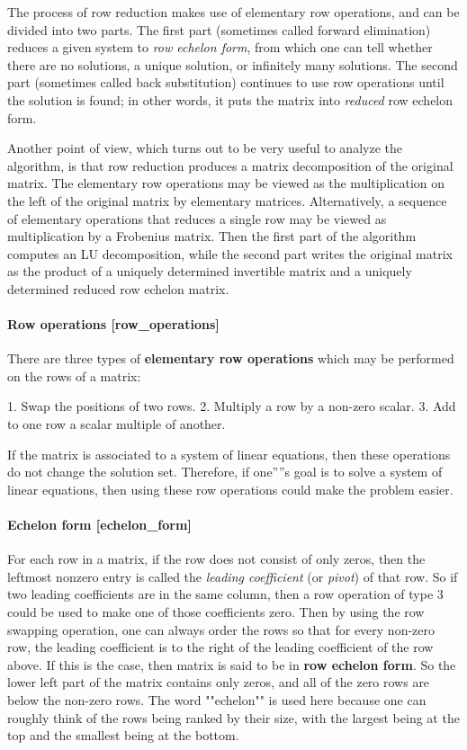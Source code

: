{{{{{{{{{{{{{{{{The process of row reduction makes use of elementary row operations, and
can be divided into two parts. The first part (sometimes called forward
elimination) reduces a given system to \textit{row echelon form}, from which
one can tell whether there are no solutions, a unique solution, or
infinitely many solutions. The second part (sometimes called back
substitution) continues to use row operations until the solution is
found; in other words, it puts the matrix into \textit{reduced} row echelon
form.

Another point of view, which turns out to be very useful to analyze the
algorithm, is that row reduction produces a matrix decomposition of the
original matrix. The elementary row operations may be viewed as the
multiplication on the left of the original matrix by elementary
matrices. Alternatively, a sequence of elementary operations that
reduces a single row may be viewed as multiplication by a Frobenius
matrix. Then the first part of the algorithm computes an LU
decomposition, while the second part writes the original matrix as the
product of a uniquely determined invertible matrix and a uniquely
determined reduced row echelon matrix.

\paragraph{Row operations [row_operations]}

There are three types of \textbf{elementary row operations} which may be
performed on the rows of a matrix:

1.  Swap the positions of two rows.
2.  Multiply a row by a non-zero scalar.
3.  Add to one row a scalar multiple of another.

If the matrix is associated to a system of linear equations, then these
operations do not change the solution set. Therefore, if one''''s goal is
to solve a system of linear equations, then using these row operations
could make the problem easier.

\paragraph{Echelon form [echelon_form]}

For each row in a matrix, if the row does not consist of only zeros,
then the leftmost nonzero entry is called the \textit{leading coefficient} (or
\textit{pivot}) of that row. So if two leading coefficients are in the same
column, then a row operation of type 3 could be used to make one of
those coefficients zero. Then by using the row swapping operation, one
can always order the rows so that for every non-zero row, the leading
coefficient is to the right of the leading coefficient of the row above.
If this is the case, then matrix is said to be in \textbf{row echelon form}.
So the lower left part of the matrix contains only zeros, and all of the
zero rows are below the non-zero rows. The word ""echelon"" is used here
because one can roughly think of the rows being ranked by their size,
with the largest being at the top and the smallest being at the bottom.

}}}}}}}}}}}}}}}}
